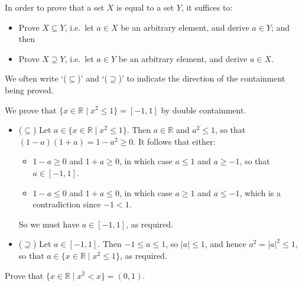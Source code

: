 \begin{strategy}
In order to prove that a set $X$ is equal to a set $Y$, it suffices to:
\begin{itemize}
\item Prove $X \subseteq Y$, i.e.\ let $a \in X$ be an arbitrary element, and derive $a \in Y$; and then
\item Prove $X \supseteq Y$, i.e.\ let $a \in Y$ be an arbitrary element, and derive $a \in X$.
\end{itemize}
We often write `($\subseteq$)' and `($\supseteq$)' to indicate the direction of the containment being proved.
\end{strategy}

\begin{example}
\label{exPositiveNegativeSetBuilderNotation}
We prove that $\{ x \in \mathbb{R} \mid x^2 \le 1 \} = [-1,1]$ by double containment.
\begin{itemize}
\item ($\subseteq$) Let $a \in \{ x \in \mathbb{R} \mid x^2 \le 1 \}$. Then $a \in \mathbb{R}$ and $a^2 \le 1$, so that $(1-a)(1+a) = 1-a^2 \ge 0$. It follows that either:
\begin{itemize}
\item $1-a \ge 0$ and $1+a \ge 0$, in which case $a \le 1$ and $a \ge -1$, so that $a \in [-1,1]$.
\item $1-a \le 0$ and $1+a \le 0$, in which case $a \ge 1$ and $a \le -1$, which is a contradiction since $-1 < 1$.
\end{itemize}
So we must have $a \in [-1,1]$, as required.

\item ($\supseteq$) Let $a \in [-1,1]$. Then $-1 \le a \le 1$, so $|a| \le 1$, and hence $a^2 = |a|^2 \le 1$, so that $a \in \{ x \in \mathbb{R} \mid x^2 \le 1 \}$, as required.
\end{itemize}
\end{example}

\begin{exercise}
Prove that $\{ x \in \mathbb{R} \mid x^2 < x \} = (0,1)$.
\end{exercise}

